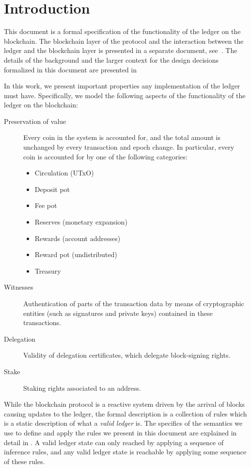 \section{Introduction}
\label{sec:introduction-shelley}

This document is a formal specification of the functionality of the ledger
on the blockchain. The blockchain layer of the
protocol and the interaction between the ledger and the blockchain
layer is presented in a separate document, see~\cite{shelley_consensus}. The details of the
background and the larger context
for the design decisions formalized in this document are presented
in~\cite{delegation_design}

In this work,
we present important properties any implementation of the ledger must have.
Specifically, we model the following aspects
of the functionality of the ledger on the blockchain:

\begin{description}
\item[Preservation of value] Every coin in the system is accounted for,
  and the total amount is unchanged by every transaction and epoch change.
  In particular, every coin is accounted for by one of the following categories:
  \begin{itemize}
    \item Circulation (UTxO)
    \item Deposit pot
    \item Fee pot
    \item Reserves (monetary expansion)
    \item Rewards (account addresses)
    \item Reward pot (undistributed)
    \item Treasury
  \end{itemize}
\item[Witnesses] Authentication of parts of the transaction data by means of
  cryptographic entities (such as signatures and private keys) contained in
  these transactions.
\item[Delegation] Validity of delegation certificates, which delegate
  block-signing rights.
\item[Stake] Staking rights associated to an address.
\end{description}

While the blockchain protocol is a reactive system driven by the arrival
of blocks causing updates to the ledger, the formal description is a collection
of rules which is a
static description of what a \textit{valid ledger} is. The specifics of the
semantics we use to define and apply
the rules we present in this document are explained in detail in
\cite{small_step_semantics}. A valid ledger state can only
reached by applying a sequence of inference rules, and any valid ledger state
is reachable by applying some sequence of these rules.

